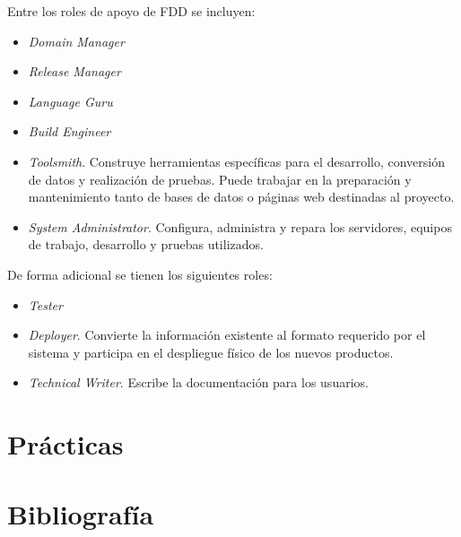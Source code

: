 \documentclass[11pt]{article}
\begin{document}
Entre los roles de apoyo de FDD se incluyen:

\begin{itemize}
\item \textit{Domain Manager}
\item \textit{Release Manager}
\item \textit{Language Guru}
\item \textit{Build Engineer}
\item \textit{Toolsmith}. Construye herramientas específicas para el desarrollo, conversión de datos y realización de pruebas. Puede trabajar en la preparación y mantenimiento tanto de bases de datos o páginas web destinadas al proyecto.
\item \textit{System Administrator}. Configura, administra y repara los servidores, equipos de trabajo, desarrollo y pruebas utilizados. 
\end{itemize}

De forma adicional se tienen los siguientes roles:

\begin{itemize}
\item \textit{Tester}
\item \textit{Deployer}. Convierte la información existente al formato requerido por el sistema y participa en el despliegue físico de los nuevos productos. 
\item \textit{Technical Writer}. Escribe la documentación para los usuarios.

\end{itemize}

\section{Prácticas}

\newpage
\section{Bibliografía}
\nocite{*}


\end{document}
